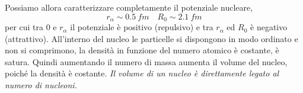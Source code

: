 Possiamo allora caratterizzare completamente il potenziale nucleare,
\begin{equation}
r_{\alpha} \sim \SI{0.5}{fm} 
\quad
R_{0} \sim \SI{2.1}{fm}
\end{equation}
per cui tra $0$ e $r_{\alpha}$ il potenziale è positivo (repulsivo) e tra $r_{\alpha}$ ed $R_0$ è negativo (attrattivo).
All'interno del nucleo le particelle si dispongono in modo ordinato e non si comprimono, la densità in funzione del numero atomico è costante, è satura.
Quindi aumentando il numero di massa aumenta il volume del nucleo, poiché la densità è costante.
\emph{Il volume di un nucleo è direttamente legato al numero di nucleoni.}










